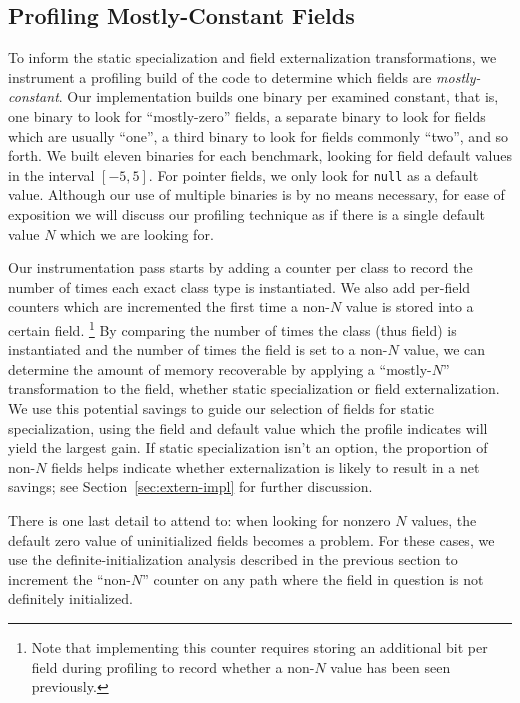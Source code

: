 \documentclass{sig-alt-full}
\begin{document}
\subsection{Profiling Mostly-Constant Fields}
To inform the static specialization and field externalization
transformations, we instrument a profiling build of the code
to determine which fields are {\it mostly-constant}.  Our implementation
builds one binary per examined constant, that is, one binary to look
for ``mostly-zero'' fields, a separate binary to look for fields which
are usually ``one'', a third binary to look for fields commonly
``two'', and so forth.  We built eleven binaries for each benchmark,
looking for
field default values in the interval $[-5,5]$.
For pointer fields, we only look for {\tt null} as a default value.
Although our use of multiple binaries is by no means necessary,
for ease of exposition we will discuss our profiling technique
as if there is a single default value $N$ which we are looking for.

Our instrumentation pass starts by
adding a counter per class
to record the number of times each exact class type is instantiated.
We also add per-field counters which are incremented the first
time a non-$N$ value is stored into a certain field.%
\footnote{Note that implementing this counter requires storing an
  additional bit per field during profiling
  to record whether a non-$N$ value has been seen previously.}
By comparing the
number of times the class (thus field) is instantiated and the number
of times the field is set to a non-$N$ value, we can determine the
amount of memory recoverable by applying a ``mostly-$N$''
transformation to the field, whether static specialization or field
externalization.  We use this potential savings to guide our selection
of fields for static specialization, using the field and default value
which the profile indicates will yield the largest gain.  If static
specialization isn't an option, the
proportion of non-$N$ fields helps indicate whether externalization is
likely to result in a net savings; see Section~\ref{sec:extern-impl}
for further discussion.

There is one last detail to attend to:  when looking for nonzero $N$
values, the default zero value of
uninitialized fields becomes a problem.  For these cases, we use the
definite-initialization analysis described in the previous section to
increment the
``non-$N$'' counter on any path where the field in question is not
definitely initialized.
\end{document}
